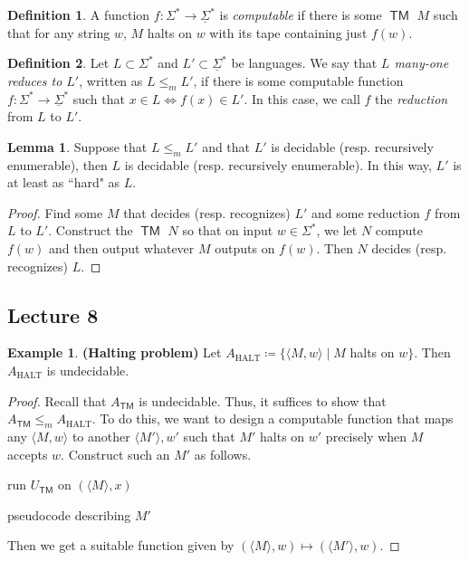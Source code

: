 \documentclass[10pt,letterpaper,cm]{nupset}
\theoremstyle{definition}
\newtheorem*{definition}{Definition}
\newtheorem{exmp}{Example}
\newtheorem{lemma}{Lemma}
\newcommand{\1}{\mathbf{1}}
\newcommand{\0}{\vec 0}
\DeclareMathOperator{\TM}{\mathsf{TM}}
\begin{document}
\begin{definition}
A function $f: \Sigma^{\ast} \to \underline{\Sigma}^{\ast}$ is \textit{computable} if there is some $\TM$ $M$ such that for any string $w$, $M$ halts on $w$ with its tape containing just $f(w)$. 
\end{definition}

\begin{definition}
Let $L\subset \Sigma^{\ast}$ and $L' \subset \underline{\Sigma}^{\ast}$ be languages. We say that \textit{$L$ many-one reduces to $L'$}, written as $L \leq_m L'$, if there is some computable function $f: \Sigma^{\ast} \to \underline{\Sigma}^{\ast}$ such that $x\in L \iff f(x) \in L'$. In this case, we call $f$ the \textit{reduction} from $L$ to $L'$.
\end{definition}

\begin{lemma}
Suppose that $L \leq_m L'$ and that $L'$ is decidable (resp. recursively enumerable), then $L$ is decidable (resp. recursively enumerable). In this way, $L'$ is at least as ``hard" as $L$.
\end{lemma}
\begin{proof}
Find some $M$ that decides (resp. recognizes) $L'$ and some reduction $f$ from $L$ to $L'$. Construct the $\TM$ $N$ so that on input $w\in \Sigma^{\ast}$, we let $N$ compute $f(w)$ and then output whatever $M$ outputs on $f(w)$. Then $N$ decides (resp. recognizes) $L$. 
\end{proof}

\subsection{Lecture 8}

\begin{exmp}{\textbf{(Halting problem)}}
Let $A_{\text{HALT}} \coloneqq \{\langle M, w \rangle \mid M$ halts on $w\}$. Then $A_{\text{HALT}}$ is undecidable.
\end{exmp}
\begin{proof}
Recall that $A_{\TM}$ is undecidable. Thus, it suffices to show that $A_{\TM} \leq_m A_{\text{HALT}}$. To do this, we want to design a computable function that maps any $\langle M, w \rangle$ to another $\langle M' \rangle, w'$ such that $M'$ halts on $w'$ precisely when $M$ accepts $w$. Construct such an $M'$ as follows.

\begin{algorithm}[H]
    {run $U_{\TM}$ on $(\langle M \rangle, x)$}\;
     \eIf{$U_{\TM}$ accepts}{accept}{
     \While{true}{pass}
     } 
      \caption{pseudocode describing $M'$}
\end{algorithm}

Then we get a suitable function given by $(\langle M \rangle , w) \mapsto (\langle M' \rangle, w)$.
\end{proof}
\end{document}
